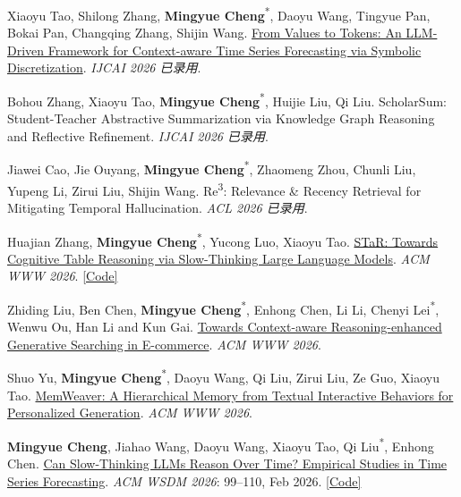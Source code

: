 \documentclass[UTF8,fontset=fandol,scheme=plain,11pt,a4paper]{ctexart}
\newcommand{\pubentry}[1]{\item \begin{minipage}[t]{\linewidth}#1\end{minipage}}
\begin{document}
\begin{publist}[start=4]
\pubentry{Xiaoyu Tao, Shilong Zhang, \textbf{Mingyue Cheng}\textsuperscript{*}, Daoyu Wang, Tingyue Pan, Bokai Pan, Changqing Zhang, Shijin Wang. \href{https://arxiv.org/pdf/2508.09191}{From Values to Tokens: An LLM-Driven Framework for Context-aware Time Series Forecasting via Symbolic Discretization}. \emph{IJCAI 2026 已录用}.}

\pubentry{Bohou Zhang, Xiaoyu Tao, \textbf{Mingyue Cheng}\textsuperscript{*}, Huijie Liu, Qi Liu. ScholarSum: Student-Teacher Abstractive Summarization via Knowledge Graph Reasoning and Reflective Refinement. \emph{IJCAI 2026 已录用}.}

\pubentry{Jiawei Cao, Jie Ouyang, \textbf{Mingyue Cheng}\textsuperscript{*}, Zhaomeng Zhou, Chunli Liu, Yupeng Li, Zirui Liu, Shijin Wang. Re\textsuperscript{3}: Relevance \& Recency Retrieval for Mitigating Temporal Hallucination. \emph{ACL 2026 已录用}.}

\pubentry{Huajian Zhang, \textbf{Mingyue Cheng}\textsuperscript{*}, Yucong Luo, Xiaoyu Tao. \href{https://arxiv.org/pdf/2511.11233}{STaR: Towards Cognitive Table Reasoning via Slow-Thinking Large Language Models}. \emph{ACM WWW 2026}. \href{https://github.com/zhjai/STaR}{[Code]}}

\pubentry{Zhiding Liu, Ben Chen, \textbf{Mingyue Cheng}\textsuperscript{*}, Enhong Chen, Li Li, Chenyi Lei\textsuperscript{*}, Wenwu Ou, Han Li and Kun Gai. \href{https://arxiv.org/abs/2510.16925}{Towards Context-aware Reasoning-enhanced Generative Searching in E-commerce}. \emph{ACM WWW 2026}.}

\pubentry{Shuo Yu, \textbf{Mingyue Cheng}\textsuperscript{*}, Daoyu Wang, Qi Liu, Zirui Liu, Ze Guo, Xiaoyu Tao. \href{https://arxiv.org/abs/2510.07713}{MemWeaver: A Hierarchical Memory from Textual Interactive Behaviors for Personalized Generation}. \emph{ACM WWW 2026}.}

\pubentry{\textbf{Mingyue Cheng}, Jiahao Wang, Daoyu Wang, Xiaoyu Tao, Qi Liu\textsuperscript{*}, Enhong Chen. \href{https://dl.acm.org/doi/10.1145/3773966.3777931}{Can Slow-Thinking LLMs Reason Over Time? Empirical Studies in Time Series Forecasting}. \emph{ACM WSDM 2026}: 99--110, Feb 2026. \href{https://github.com/realwangjiahao/TimeReasoner}{[Code]}}


\end{publist}
\end{document}
